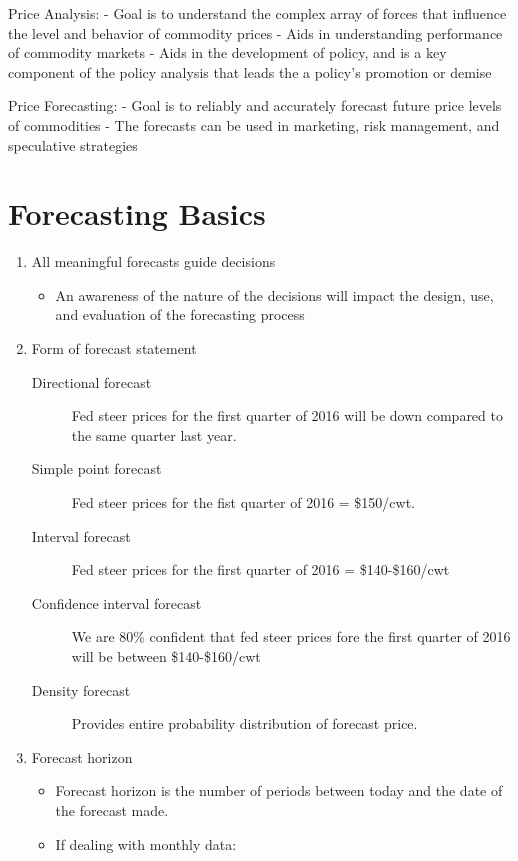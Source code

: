 \documentclass[
  letterpaper,
  DIV=11,
  numbers=noendperiod]{scrreprt}
\providecommand{\tightlist}{%
  \setlength{\itemsep}{0pt}\setlength{\parskip}{0pt}}\usepackage{longtable,booktabs,array}
\begin{document}
Price Analysis: - Goal is to understand the complex array of forces that
influence the level and behavior of commodity prices - Aids in
understanding performance of commodity markets - Aids in the development
of policy, and is a key component of the policy analysis that leads the
a policy's promotion or demise

Price Forecasting: - Goal is to reliably and accurately forecast future
price levels of commodities - The forecasts can be used in marketing,
risk management, and speculative strategies

\section{Forecasting Basics}\label{forecasting-basics}

\begin{enumerate}
\def\labelenumi{\arabic{enumi}.}
\item
  All meaningful forecasts guide decisions

  \begin{itemize}
  \tightlist
  \item
    An awareness of the nature of the decisions will impact the design,
    use, and evaluation of the forecasting process
  \end{itemize}
\item
  Form of forecast statement

  \begin{description}
  \item[Directional forecast]
  Fed steer prices for the first quarter of 2016 will be down compared
  to the same quarter last year.
  \item[Simple point forecast]
  Fed steer prices for the fist quarter of 2016 = \$150/cwt.
  \item[Interval forecast]
  Fed steer prices for the first quarter of 2016 = \$140-\$160/cwt
  \item[Confidence interval forecast]
  We are 80\% confident that fed steer prices fore the first quarter of
  2016 will be between \$140-\$160/cwt
  \item[Density forecast]
  Provides entire probability distribution of forecast price.
  \end{description}
\item
  Forecast horizon

  \begin{itemize}
  \item
    Forecast horizon is the number of periods between today and the date
    of the forecast made.
  \item
    If dealing with monthly data:


\end{itemize}
\end{enumerate}
\end{document}
